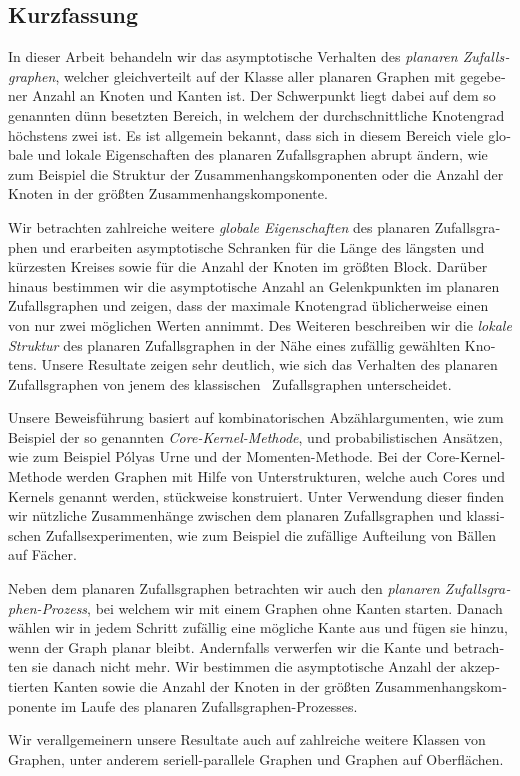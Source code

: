 \documentclass[twoside,openright,bibliography=totoc]{scrreprt}
\theoremstyle{remark}
\theoremstyle{definition}
\theoremstyle{claim}
\begin{document}
\begin{otherlanguage}{ngerman}
\chapter*{Kurzfassung}
In dieser Arbeit behandeln wir das asymptotische Verhalten des {\em planaren Zufallsgraphen}, welcher gleichverteilt auf der Klasse aller planaren Graphen mit gegebener Anzahl an Knoten und Kanten ist. Der Schwerpunkt liegt dabei auf dem so genannten dünn besetzten Bereich, in welchem der durchschnittliche Knotengrad höchstens zwei ist. Es ist allgemein bekannt, dass sich in diesem Bereich viele globale und lokale Eigenschaften des planaren Zufallsgraphen abrupt ändern, wie zum Beispiel die Struktur der Zusammenhangskomponenten oder die Anzahl der Knoten in der größten Zusammenhangskomponente. 

Wir betrachten zahlreiche weitere {\em globale Eigenschaften} des planaren Zufallsgraphen und erarbeiten asymptotische Schranken für die Länge des längsten und kürzesten Kreises sowie für die Anzahl der Knoten im größten Block. Darüber hinaus bestimmen wir die asymptotische Anzahl an Gelenkpunkten im planaren Zufallsgraphen und zeigen, dass der maximale Knotengrad üblicherweise einen von nur zwei möglichen Werten annimmt. Des Weiteren beschreiben wir die {\em lokale Struktur} des planaren Zufallsgraphen in der Nähe eines zufällig gewählten Knotens. Unsere Resultate zeigen sehr deutlich, wie sich das Verhalten des planaren Zufallsgraphen von jenem des klassischen \ER\ Zufallsgraphen unterscheidet. 

Unsere Beweisführung basiert auf kombinatorischen Abzählargumenten, wie zum Beispiel der so genannten {\em Core-Kernel-Methode}, und probabilistischen Ansätzen, wie zum Beispiel P\'olyas Urne und der Momenten-Methode. Bei der Core-Kernel-Methode werden Graphen mit Hilfe von Unterstrukturen, welche auch Cores und Kernels genannt werden, stückweise konstruiert. Unter Verwendung dieser finden wir nützliche Zusammenhänge zwischen dem planaren Zufallsgraphen und klassischen Zufallsexperimenten, wie zum Beispiel die zufällige Aufteilung von Bällen auf Fächer.

Neben dem planaren Zufallsgraphen betrachten wir auch den {\em planaren Zufallsgraphen-Prozess}, bei welchem wir mit einem Graphen ohne Kanten starten. Danach wählen wir in jedem Schritt zufällig eine mögliche Kante aus und fügen sie hinzu, wenn der Graph planar bleibt. Andernfalls verwerfen wir die Kante und betrachten sie danach nicht mehr. Wir bestimmen die asymptotische Anzahl der akzeptierten Kanten sowie die Anzahl der Knoten in der größten Zusammenhangskomponente im Laufe des planaren Zufallsgraphen-Prozesses.

Wir verallgemeinern unsere Resultate auch auf zahlreiche weitere Klassen von Graphen, unter anderem seriell-parallele Graphen und Graphen auf Oberflächen.
\end{otherlanguage}
\end{document}
